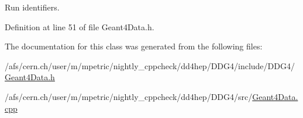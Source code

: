Run identifiers. 



Definition at line 51 of file Geant4\+Data.\+h.



The documentation for this class was generated from the following files\+:\begin{DoxyCompactItemize}
\item 
/afs/cern.\+ch/user/m/mpetric/nightly\+\_\+cppcheck/dd4hep/\+D\+D\+G4/include/\+D\+D\+G4/\hyperlink{_geant4_data_8h}{Geant4\+Data.\+h}\item 
/afs/cern.\+ch/user/m/mpetric/nightly\+\_\+cppcheck/dd4hep/\+D\+D\+G4/src/\hyperlink{_geant4_data_8cpp}{Geant4\+Data.\+cpp}\end{DoxyCompactItemize}
